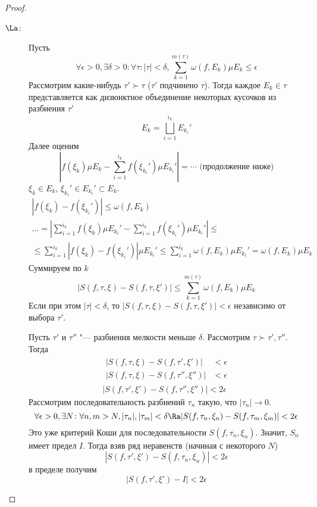 \begin{proof}
\begin{description}
	\item[$\La$:]
		Пусть
		\[
			\forall \epsilon > 0, \exists \delta > 0\colon \forall \tau\colon |\tau| < \delta,
			\sum_{k=1}^{m(\tau)} \omega(f, E_k) \mu E_k \le \epsilon
		\]
		Рассмотрим какие-нибудь $\tau' \succ \tau$ ($\tau'$ подчинено $\tau$).
		Тогда каждое $E_k \in \tau$ представляется как дизюнктное объединение некоторых кусочков из разбиения $\tau'$
		\[ E_k = \bigsqcup_{i=1}^{i_k} E_{k_i}' \]
		Далее оценим
		\[
			\left| f(\xi_k) \mu E_k - \sum_{i=1}^{i_k} f\left(\xi_{k_i}'\right) \mu E_{k_i}' \right| = \cdots \text{~(продолжение ниже)}
		\]
		$\xi_k \in E_k$, $\xi_{k_i}' \in E_{k_i}' \subset E_k$.
		\begin{gather*}
			|f(\xi_k) - f\left(\xi_{k_i}'\right)| \le \omega(f, E_k) \\
			\dots = \left| \sum_{i=1}^{i_k} f(\xi_k) \mu E_{k_i}' - \sum_{i=1}^{i_k} f(\xi_{k_i}') \mu E_{k_i}' \right| \le \\
			\le \sum_{i=1}^{i_k} \left| f(\xi_k) - f\left(\xi_{k_i}'\right) \right| \mu E_{k_i}' \le \sum_{i=1}^{i_k}  \omega(f, E_k) \mu E_{k_i}' = \omega(f, E_k) \mu E_k
		\end{gather*}
		Суммируем по $k$
		\[
			|S(f, \tau, \xi) - S(f, \tau, \xi')| \le \sum_{k=1}^{m(\tau)} \omega(f, E_k) \mu E_k
		\]
		Если при этом $|\tau| < \delta$, то $|S(f, \tau, \xi) - S(f, \tau, \xi')| < \epsilon$ независимо от выбора $\tau'$.

		Пусть $\tau'$ и $\tau''$ "--- разбиения мелкости меньше $\delta$.
		Рассмотрим $\tau \succ \tau', \tau''$. Тогда
		\begin{gather*}
			\begin{aligned}
				|S(f, \tau, \xi) - S(f, \tau' , \xi' )| &< \epsilon \\
				|S(f, \tau, \xi) - S(f, \tau'', \xi'')| &< \epsilon
			\end{aligned} \\
			|S(f, \tau', \xi') - S(f, \tau'', \xi'')| < 2\epsilon
		\end{gather*}
		Рассмотрим последовательность разбиений $\tau_n$ такую, что $|\tau_n| \to 0$.
		\[ \forall \epsilon > 0, \exists N\colon \forall n,m > N, |\tau_n|, |\tau_m| < \delta \Ra |S(f, \tau_n, \xi_n) - S(f, \tau_m, \xi_m)| < 2\epsilon \]
		Это уже критерий Коши для последовательности $S(f, \tau_n, \xi_n)$.
		Значит, $S_n$ имеет предел $I$.
		Тогда взяв ряд неравенств (начиная с некоторого $N$)
		\[ | S(f, \tau', \xi') - S(f, \tau_n, \xi_n) | < 2\epsilon \]
		в пределе получим
		\[ | S(f, \tau', \xi') - I| < 2\epsilon \]
	\end{description}
\end{proof}

